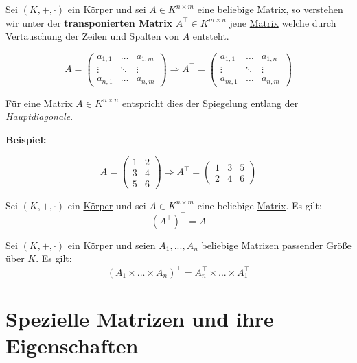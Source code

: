 \documentclass[../../main.tex]{subfiles}
\begin{document}
	\begin{definition}
		\label{def:Transponieren}
		\label{def:transponierteMatrix}
		Sei $(K,+,\cdot)$ ein \hyperref[def:Körper]{Körper} und sei $A\in K^{n \times m}$ eine beliebige \hyperref[def:Matrix]{Matrix}, so verstehen wir unter der \textbf{transponierten Matrix} $A^\top \in K^{m \times n}$ jene \hyperref[def:Matrix]{Matrix} welche durch Vertauschung der Zeilen und Spalten von $A$ entsteht.
		
		$$A = \begin{pmatrix} a_{1,1} & \dots & a_{1,m} \\ \vdots & \ddots & \vdots \\ a_{n,1} & \dots & a_{n,m} \end{pmatrix} \Rightarrow A^\top = \begin{pmatrix} a_{1,1} & \dots & a_{1,n} \\ \vdots & \ddots & \vdots \\ a_{m,1} & \dots & a_{n,m} \end{pmatrix}$$
		
		Für eine \hyperref[def:Matrix]{Matrix} $A \in K^{n \times n}$ entspricht dies der Spiegelung entlang der \textit{Hauptdiagonale}. 
		
		\textbf{Beispiel:}
		
		$$A = \begin{pmatrix} 1 & 2 \\ 3 & 4 \\ 5 & 6 \end{pmatrix} \Rightarrow A^\top = \begin{pmatrix} 1 & 3 & 5 \\ 2 & 4 & 6 \end{pmatrix}$$
	\end{definition}

	\begin{theorem}
		Sei $(K,+,\cdot)$ ein \hyperref[def:Körper]{Körper} und sei $A\in K^{n \times m}$ eine beliebige \hyperref[def:Matrix]{Matrix}. Es gilt: $$(A^\top)^\top = A$$
	\end{theorem}

	\begin{theorem}
		Sei $(K,+,\cdot)$ ein \hyperref[def:Körper]{Körper} und seien $A_1,...,A_n$ beliebige \hyperref[def:Matrix]{Matrizen} passender Größe über $K$. Es gilt: $$(A_1 \times ... \times A_n)^\top = A_n^\top \times ... \times A_1^\top$$
	\end{theorem}

	\section{Spezielle Matrizen und ihre Eigenschaften}
	
\end{document}
